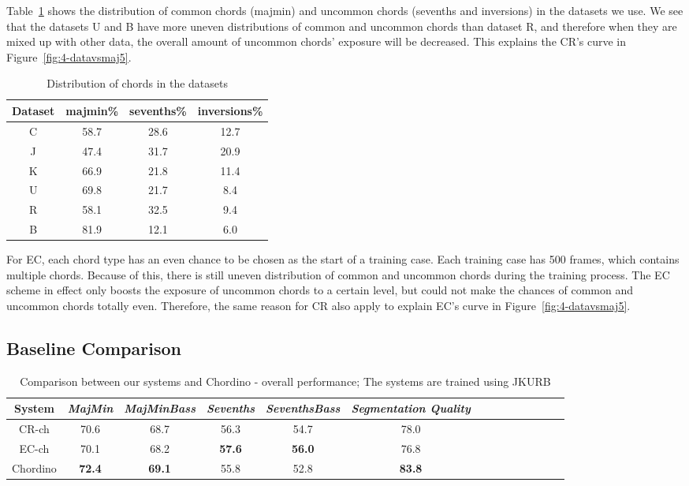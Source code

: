 Table~\ref{tab:4-chorddist} shows the distribution of common chords (majmin) and uncommon chords (sevenths and inversions) in the datasets we use. We see that the datasets U and B have more uneven distributions of common and uncommon chords than dataset R, and therefore when they are mixed up with other data, the overall amount of uncommon chords' exposure will be decreased. This explains the CR's curve in Figure~\ref{fig:4-datavsmaj5}.
\begin{table}[h]
	\centering
	\scriptsize
	\caption{Distribution of chords in the datasets}
	\label{tab:4-chorddist}
	\begin{tabular}{|c|c|c|c|}\hline
		Dataset & majmin\% & sevenths\% & inversions\%\\ \hline
		C & 58.7 &	28.6 & 12.7\\ \hline
		J & 47.4 & 31.7 & 20.9\\ \hline
		K & 66.9 & 21.8 & 11.4\\ \hline
		U & 69.8 & 21.7 & 8.4\\ \hline
		R & 58.1 & 32.5 & 9.4\\ \hline
		B & 81.9 & 12.1 & 6.0\\ \hline
	\end{tabular}
\end{table}
For EC, each chord type has an even chance to be chosen as the start of a training case. Each training case has 500 frames, which contains multiple chords. Because of this, there is still uneven distribution of common and uncommon chords during the training process. The EC scheme in effect only boosts the exposure of uncommon chords to a certain level, but could not make the chances of common and uncommon chords totally even. Therefore, the same reason for CR also apply to explain EC's curve in Figure~\ref{fig:4-datavsmaj5}.


\subsection{Baseline Comparison}

\begin{table}[htb]
	\caption{Comparison between our systems and Chordino - overall performance; The systems are trained using JKURB}
	\label{tab:4-cpcd}
	\centering
	\scriptsize
	\begin{tabular}{|c|c|c|c|c|c|c|c|c|c|c|c|c|c|}\hline
		System & \textit{MajMin} & \textit{MajMinBass} & \textit{Sevenths} & \textbf{\textit{SeventhsBass}} & \textit{Segmentation Quality}\\ \hline
		CR-ch & 70.6 & 68.7 & 56.3 & 54.7 & 78.0\\ \hline
		EC-ch & 70.1 & 68.2 & \textbf{57.6} & \textbf{56.0} & 76.8\\ \hline
		Chordino & \textbf{72.4} & \textbf{69.1} & 55.8 & 52.8 & \textbf{83.8}\\ \hline
	\end{tabular}
\end{table}

